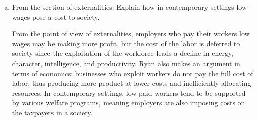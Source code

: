 \documentclass{article}
\begin{document}
\begin{enumerate}[a)]
  \item From the section of externalities: Explain how in contemporary settings low wages pose a cost to society.
  \par From the point of view of externalities, employers who pay their workers low wages may be making more profit, but the cost of the labor is deferred to society since the exploitation of the workforce leads a decline in energy, character, intelligence, and productivity. Ryan also makes an argument in terms of economics: businesses who exploit workers do not pay the full cost of labor, thus producing more product at lower costs and inefficiently allocating resources. In contemporary settings, low-paid workers tend to be supported by various welfare programs, meaning employers are also imposing costs on the taxpayers in a society.
\end{enumerate}
\end{document}
